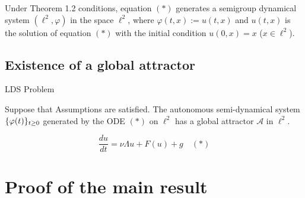 \documentclass[11pt]{beamer}
\begin{document}
\begin{frame}
Under Theorem 1.2 conditions, equation \((*)\) generates a semigroup dynamical system $(\ell^{2},\varphi)$ in the space $\ell^{2}$, where $\varphi(t,x):=u(t,x)$ and $u(t,x)$ is the solution of equation \((*)\) with the initial condition $u(0,x)=x$ ($x\in \ell^{2}$).
\end{frame}


\subsection{Existence of a global attractor}
\begin{frame}{LDS Problem}
   \begin{theorem}
       Suppose that Assumptions are satisfied. The autonomous semi-dynamical system $\{\mathnormal{\varphi}(t)\}_{t \geq 0}$ generated by the ODE \((*)\) on $\ell^2$ has a global attractor $\mathcal{A}$ in $\ell^2$.
   \end{theorem}
   \[ \frac{du}{dt} = \nu \Lambda u + F(u) + g \quad (*)\]
\end{frame}

\section{Proof of the main result}
\end{document}
